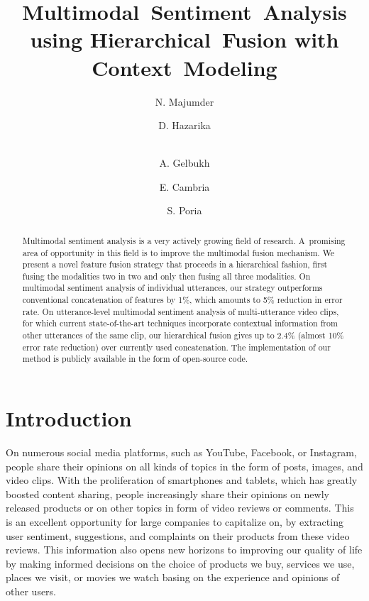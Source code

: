 \documentclass[review]{elsarticle}
\author[ipn]{N. Majumder}
\author[nus]{D. Hazarika}
\author[ipn]{\\A. Gelbukh}
\author[ntu]{E. Cambria}
\author[ntu]{S. Poria}
\newcommand\?[1]{\hl{#1}}
\begin{document}
\title{Multimodal~Sentiment~Analysis using Hierarchical~Fusion with Context~Modeling}

\begin{abstract}
    Multimodal sentiment analysis is a very actively growing field of
    research. A~pro\-mi\-sing area of opportunity in this field is to
    improve the multimodal fusion mechanism. We present a novel
    feature fusion strategy that proceeds in a hierarchical fashion, first
    fusing the modalities two in two and only then fusing all three
    modalities. On multimodal sentiment analysis of individual utterances, 
    our strategy outperforms conventional concatenation of
    features by 1\%, which amounts to 5\% reduction in error rate. 
    On utterance-level multimodal sentiment analysis of multi-utterance video clips,
    for which current state-of-the-art techniques incorporate contextual information 
    from other utterances of the same clip, our hierarchical fusion gives up to 2.4\% 
    (almost 10\% error rate reduction) over currently used concatenation.
    The implementation of our method is publicly available in the form of open-source code.
\end{abstract}

\maketitle

\section{Introduction}

On numerous social media platforms, such as YouTube, Facebook, or Instagram, people share their
opinions on all kinds of topics in the form of posts, images, and video clips. 
With the proliferation of smartphones and tablets, which has greatly boosted content sharing, 
people increasingly share their opinions on newly released products or on other topics in form of video reviews or comments. 
This is an excellent opportunity for large companies to capitalize on, by extracting
user sentiment, suggestions, and complaints on their products from these video reviews.
This information also opens new horizons to improving our quality of life by making informed
decisions on the choice of products we buy, services we use, places we visit, or movies we watch
basing on the experience and opinions of other users.
\end{document}
